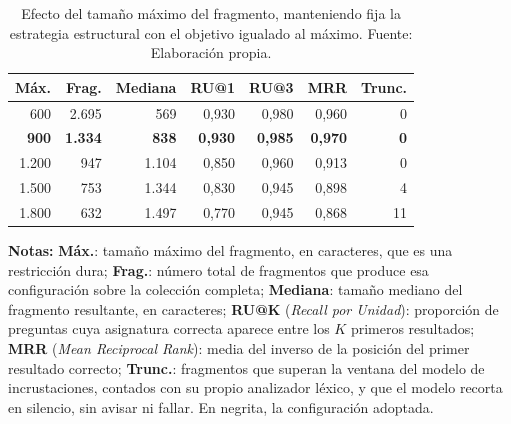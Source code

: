\begin{table}[htbp]
  \centering
  \caption[Efecto del tamaño máximo con la estrategia elegida]{Efecto
      del tamaño máximo del fragmento, manteniendo fija la estrategia estructural con el
      objetivo igualado al máximo. Fuente: Elaboración propia.}
  \label{tab:tamano_fragmento}
  \small
  \begin{tabular}{@{}rrrrrrr@{}}
    \toprule
    \textbf{Máx.} & \textbf{Frag.} & \textbf{Mediana} & \textbf{RU@1}  & \textbf{RU@3}  & \textbf{MRR}   & \textbf{Trunc.} \\
    \midrule
    600           & 2.695          & 569              & 0,930          & 0,980          & 0,960          & 0               \\
    \textbf{900}  & \textbf{1.334} & \textbf{838}     & \textbf{0,930} & \textbf{0,985} & \textbf{0,970} & \textbf{0}      \\
    1.200         & 947            & 1.104            & 0,850          & 0,960          & 0,913          & 0               \\
    1.500         & 753            & 1.344            & 0,830          & 0,945          & 0,898          & 4               \\
    1.800         & 632            & 1.497            & 0,770          & 0,945          & 0,868          & 11              \\
    \bottomrule
  \end{tabular}
  \begin{minipage}{0.95\textwidth}
    \vspace{4pt}
    \tiny
    \textbf{Notas:} \textbf{Máx.}: tamaño máximo del fragmento, en caracteres, que es una
    restricción dura; \textbf{Frag.}: número total de fragmentos que produce esa
    configuración sobre la colección completa; \textbf{Mediana}: tamaño mediano del
    fragmento resultante, en caracteres; \textbf{RU@K} (\textit{Recall por Unidad}):
    proporción de preguntas cuya asignatura correcta aparece entre los $K$ primeros
    resultados; \textbf{MRR} (\textit{Mean Reciprocal Rank}): media del inverso de la
    posición del primer resultado correcto; \textbf{Trunc.}: fragmentos que superan la
    ventana del modelo de incrustaciones, contados con su propio analizador léxico, y que el
    modelo recorta en silencio, sin avisar ni fallar. En negrita, la configuración adoptada.
  \end{minipage}
\end{table}
